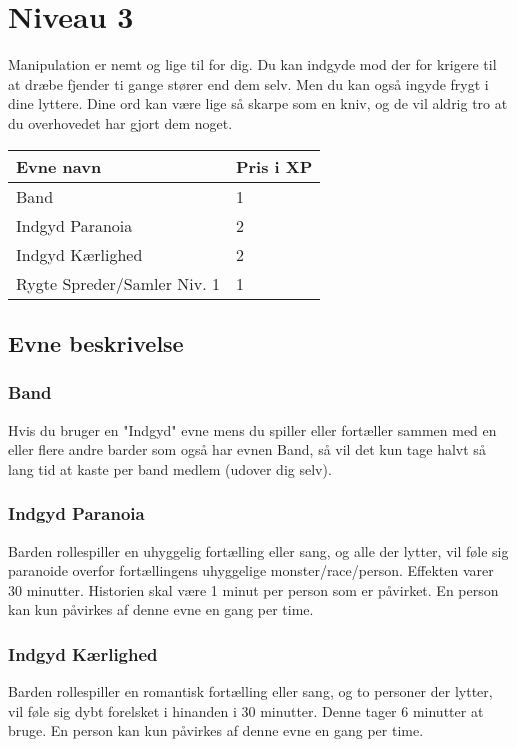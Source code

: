 \chapter*{Niveau 3}
Manipulation er nemt og lige til for dig. Du kan indgyde mod der for krigere til at dræbe fjender ti gange stører end dem selv. Men du kan også ingyde frygt i dine lyttere. Dine ord kan være lige så skarpe som en kniv, og de vil aldrig tro at du overhovedet har gjort dem noget.

\begin{table}[H]
    \centering
    \begin{tabular}{|p{}|p{}|}
    \rowcolor{cerulean!80}\hline
        Evne navn & Pris i XP \\\hline
        Band & 1 \\\hline
        Indgyd Paranoia &2\\\hline
        Indgyd Kærlighed &2\\\hline
        Rygte Spreder/Samler Niv. 1 &1\\\hline
    \end{tabular}
\end{table}
\section*{Evne beskrivelse}

\subsection*{Band}
Hvis du bruger en "Indgyd" evne mens du spiller eller fortæller sammen med en eller flere andre barder som også har evnen Band, så vil det kun tage halvt så lang tid at kaste per band medlem (udover dig selv).

\subsection*{Indgyd Paranoia}
Barden rollespiller en uhyggelig fortælling eller sang, og alle der lytter, vil føle sig paranoide overfor fortællingens uhyggelige monster/race/person. Effekten varer 30 minutter. Historien skal være 1 minut per person som er påvirket. En person kan kun påvirkes af denne evne en gang per time.

\subsection*{Indgyd Kærlighed}
Barden rollespiller en romantisk fortælling eller sang, og to personer der lytter, vil føle sig dybt forelsket i hinanden i 30 minutter. Denne tager 6 minutter at bruge. En person kan kun påvirkes af denne evne en gang per time.

